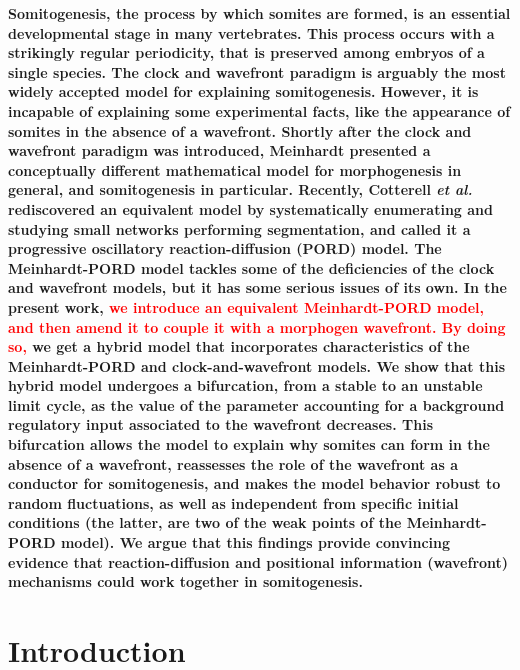 \documentclass[%
 preprint,
 aip, 
 amsmath,amssymb,
]{revtex4-2}
\begin{document}
\maketitle

\textbf{
Somitogenesis, the process by which somites are formed, is an essential developmental stage in many vertebrates. This process occurs with a strikingly regular periodicity, that is preserved among embryos of a single species. The clock and wavefront paradigm is arguably the most widely accepted model for explaining somitogenesis. However, it is incapable of explaining some experimental facts, like the appearance of somites in the absence of a wavefront. Shortly after the clock and wavefront paradigm was introduced, Meinhardt presented a conceptually different mathematical model for morphogenesis in general, and somitogenesis in particular. Recently, Cotterell \emph{et al.} rediscovered an equivalent model by systematically enumerating and studying small networks performing segmentation, and called it a progressive oscillatory reaction-diffusion (PORD) model. The Meinhardt-PORD model tackles some of the deficiencies of the clock and wavefront models, but it has some serious issues of its own. In the present work, \textcolor{red}{we introduce an equivalent Meinhardt-PORD model, and then amend it to couple it with a morphogen wavefront. By doing so,} we get a hybrid model that incorporates characteristics of the Meinhardt-PORD and clock-and-wavefront models. We show that this hybrid model undergoes a bifurcation, from a stable to an unstable limit cycle, as the value of the parameter accounting for a background regulatory input associated to the wavefront decreases. This bifurcation allows the model to explain why somites can form in the absence of a wavefront, reassesses the role of the wavefront as a conductor for somitogenesis, and makes the model behavior robust to random fluctuations, as  well as independent from specific initial conditions (the latter, are two of the weak points of the Meinhardt-PORD model). We argue that this findings provide convincing evidence that reaction-diffusion and positional information (wavefront) mechanisms could work together in somitogenesis.	
}

\section{Introduction}
\label{intro}
\end{document}
